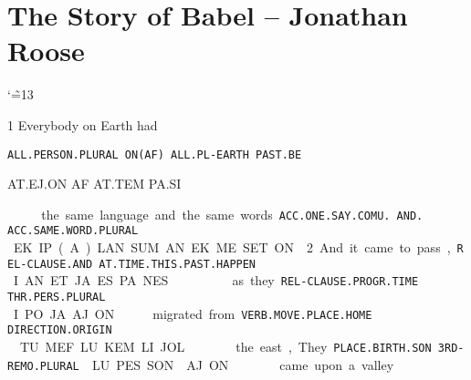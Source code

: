 {\setlength{\parindent}{0pt}
\section{The Story of Babel -- {\small Jonathan Roose}}
{
\catcode`\~=13\def\~{\hspace{0.2cm}}
\baselineskip

1 Everybody		on 	Earth 		had

{\tt ALL.PERSON.PLURAL   	ON(AF)	ALL.PL-EARTH	PAST.BE	 }

AT.EJ.ON		AF	AT.TEM		PA.SI	 

\at\ej\on	~	\af~	\at\tem		~\pa\si	 

\vspace{0.2cm}

the same language	 and 	the same words. 

{\tt ACC.ONE.SAY.COMU.	AND.	ACC.SAME.WORD.PLURAL }

EK.IP.(A).LAN.SUM	AN	EK.ME.SET.ON

\vspace{0.5cm}

2 And	 		it came to pass, 			  

{\tt REL-CLAUSE.AND            AT.TIME.THIS.PAST.HAPPEN 		}

I.AN			ET.JA.ES.PA.NES				 

\Atlani\an                    \et\ja\es\pa\nes

\def\drie{\vspace{0.3cm}}
\drie

as	they	    

{\tt REL-CLAUSE.PROGR.TIME	THR.PERS.PLURAL }

I.PO.JA	.AJ.ON 

\Atlani\po\ja	\aj\on 


migrated          			from      		 

{\tt VERB.MOVE.PLACE.HOME	DIRECTION.ORIGIN	 }

\def\spak{\hspace{0.2cm}}
TU.MEF.LU.KEM LI.JOL 

\tu\mef\lu\kem\spak \li\jol

 

the east, 		They 		 

{\tt PLACE.BIRTH.SON	3RD-REMO.PLURAL }

LU.PES.SON \spak		AJ.ON 

\lu\pes\son \spak \aj\on

\drie 

came upon 		a valley                 

}}

